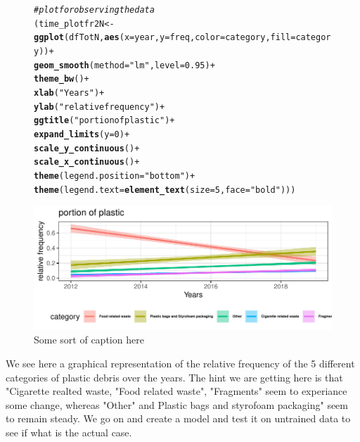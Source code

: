 \documentclass[10pt]{article}\usepackage[]{graphicx}\usepackage[]{color}
\makeatletter
\newcommand{\hlnum}[1]{\textcolor[rgb]{0.686,0.059,0.569}{#1}}%
\newcommand{\hlstr}[1]{\textcolor[rgb]{0.192,0.494,0.8}{#1}}%
\newcommand{\hlcom}[1]{\textcolor[rgb]{0.678,0.584,0.686}{\textit{#1}}}%
\newcommand{\hlopt}[1]{\textcolor[rgb]{0,0,0}{#1}}%
\newcommand{\hlstd}[1]{\textcolor[rgb]{0.345,0.345,0.345}{#1}}%
\newcommand{\hlkwb}[1]{\textcolor[rgb]{0.69,0.353,0.396}{#1}}%
\newcommand{\hlkwc}[1]{\textcolor[rgb]{0.333,0.667,0.333}{#1}}%
\newcommand{\hlkwd}[1]{\textcolor[rgb]{0.737,0.353,0.396}{\textbf{#1}}}%
\newenvironment{kframe}{%
 \def\at@end@of@kframe{}%
 \ifinner\ifhmode%
  \def\at@end@of@kframe{\end{minipage}}%
  \begin{minipage}{\columnwidth}%
 \fi\fi%
 \def\FrameCommand##1{\hskip\@totalleftmargin \hskip-\fboxsep
 \colorbox{shadecolor}{##1}\hskip-\fboxsep
     \hskip-\linewidth \hskip-\@totalleftmargin \hskip\columnwidth}%
 \MakeFramed {\advance\hsize-\width
   \@totalleftmargin\z@ \linewidth\hsize
   \@setminipage}}%
 {\par\unskip\endMakeFramed%
 \at@end@of@kframe}
\newenvironment{knitrout}{}{} %
\makeatother
\begin{document}
\begin{figure}[H] 
\begin{center}
\begin{knitrout}\small
{}\color{fgcolor}\begin{kframe}
\begin{alltt}
\hlcom{# plot for observing the data}
\hlstd{(time_plotfr2N} \hlkwb{<-} \hlkwd{ggplot}\hlstd{(dfTotN,} \hlkwd{aes}\hlstd{(}\hlkwc{x} \hlstd{= year,} \hlkwc{y} \hlstd{= freq,} \hlkwc{color}\hlstd{=category,} \hlkwc{fill} \hlstd{= category))} \hlopt{+}
  \hlkwd{geom_smooth}\hlstd{(}\hlkwc{method}\hlstd{=}\hlstr{"lm"}\hlstd{,} \hlkwc{level}\hlstd{=}\hlnum{0.95}\hlstd{)} \hlopt{+}
  \hlkwd{theme_bw}\hlstd{()} \hlopt{+}
  \hlkwd{xlab}\hlstd{(}\hlstr{"Years"}\hlstd{)} \hlopt{+}
  \hlkwd{ylab}\hlstd{(}\hlstr{"relative frequency"}\hlstd{)} \hlopt{+}
  \hlkwd{ggtitle}\hlstd{(}\hlstr{"portion of plastic"}\hlstd{)} \hlopt{+}
  \hlkwd{expand_limits}\hlstd{(}\hlkwc{y}\hlstd{=}\hlnum{0}\hlstd{)} \hlopt{+}
  \hlkwd{scale_y_continuous}\hlstd{()} \hlopt{+}
  \hlkwd{scale_x_continuous}\hlstd{()}\hlopt{+}
  \hlkwd{theme}\hlstd{(}\hlkwc{legend.position}\hlstd{=}\hlstr{"bottom"}\hlstd{)}\hlopt{+}
  \hlkwd{theme}\hlstd{(}\hlkwc{legend.text} \hlstd{=} \hlkwd{element_text}\hlstd{(}\hlkwc{size}\hlstd{=}\hlnum{5}\hlstd{,} \hlkwc{face}\hlstd{=}\hlstr{"bold"}\hlstd{)))}
\end{alltt}
\end{kframe}
\includegraphics[width=1\linewidth]{figure/unnamed-chunk-25-1} 

\end{knitrout}
\caption {Some sort of caption here}
\label{figG1}
\end {center}
\end {figure}


We see here a graphical representation of the relative frequency of the 5 different categories of plastic debris over the years. The hint we are getting here is that "Cigarette realted waste, "Food related waste", "Fragments" seem to experiance some change, whereas "Other" and Plastic bags and styrofoam packaging" seem to remain steady. We go on and create a model and test it on untrained data to see if what is the actual case.
\end{document}

